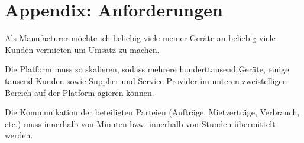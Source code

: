 \chapter{Appendix: Anforderungen}
\label{ch:appendix:requirements}


\begin{tcolorbox}[colback=white,colframe=MidnightBlue!50!black, colbacktitle=MidnightBlue!75!black,title=\textbf{\underline{M1} Geräte vermieten}]
  \label{req:m1}
  \glqq Als Manufacturer möchte ich beliebig viele meiner Geräte an beliebig viele Kunden vermieten um Umsatz zu machen. \grqq
  \tcblower
  \begin{tcolorbox}[colback=white,colframe=white!50!black, colbacktitle=white!75!black,title=Task M1.1]
    Die Platform muss so skalieren, sodass mehrere hunderttausend Geräte, einige tausend Kunden sowie Supplier und Service-Provider im unteren zweistelligen Bereich auf der Platform agieren können.
  \end{tcolorbox}
  \begin{tcolorbox}[colback=white,colframe=white!50!black, colbacktitle=white!75!black,title=Task M1.2]
    Die Kommunikation der beteiligten Parteien (Aufträge, Mietverträge, Verbrauch, etc.) muss innerhalb von Minuten bzw. innerhalb von Stunden übermittelt werden.
  \end{tcolorbox}
\end{tcolorbox}

